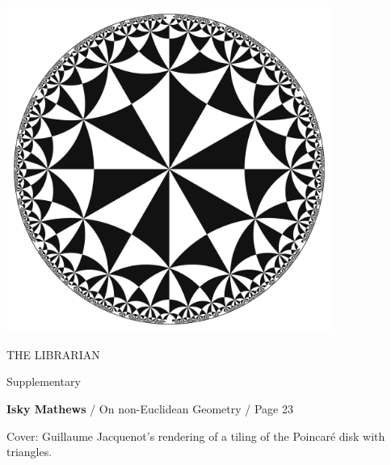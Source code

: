 %
%
%

\pagestyle{empty}

\null
\vspace{\fill}

\begin{center}
	\includegraphics[width=0.8\textwidth]{cover.png}
\end{center}

\null
\vspace{\fill}

\begin{center}

{\fontsize{40}{48}\selectfont
{THE LIBRARIAN}}
\vspace{1.2em}

Supplementary 

\vspace{1.2em}

\Large

\textbf{Isky Mathews} / On non-Euclidean Geometry / Page 23

\normalsize

\vspace{1.2em}

Cover: Guillaume Jacquenot's rendering of a tiling of the Poincaré disk with triangles.

\end{center}

%